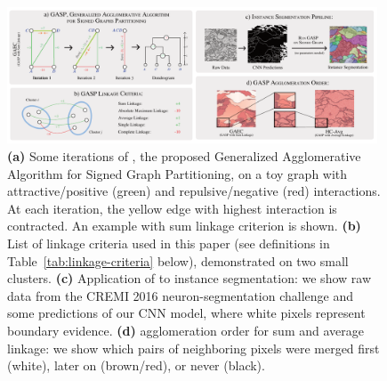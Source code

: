 
\begin{figure}[t]
\centering
\includegraphics[width=0.98\textwidth]{figs/intro_image_v6.pdf} %
\caption{\textbf{(a)} Some iterations of \algname{}, the proposed Generalized Agglomerative Algorithm for Signed Graph Partitioning, on a toy graph with attractive/positive (green) and repulsive/negative (red) interactions. At each iteration, the yellow edge with highest interaction is contracted. An example with sum linkage criterion is shown. \textbf{(b)} List of linkage criteria used in this paper (see definitions in Table~\ref{tab:linkage-criteria} below), demonstrated on two small clusters.  \textbf{(c)} Application of \algname{} to instance segmentation: we show raw data from the CREMI 2016 neuron-segmentation challenge and some predictions of our CNN model, where white pixels represent boundary evidence. \textbf{(d)} \algname{} agglomeration order for sum and average linkage: we show which pairs of neighboring pixels were merged first (white), later on (brown/red), or never (black).
\label{fig:intro_figure}}
\end{figure}

